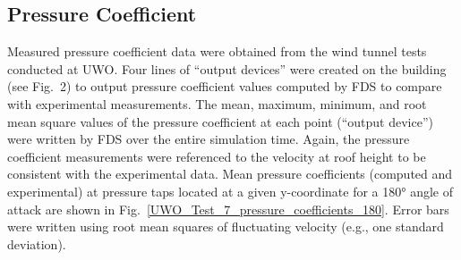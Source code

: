 %
% 
%
%
% 

\subsection{Pressure Coefficient}

Measured pressure coefficient data were obtained from the wind tunnel tests conducted at UWO. Four lines of ``output devices'' were created on the building (see Fig.~2) to output pressure coefficient values computed by FDS to compare with experimental measurements. The mean, maximum, minimum, and root mean square values of the pressure coefficient at each point (``output device'') were written by FDS over the entire simulation time. Again, the pressure coefficient measurements were referenced to the velocity at roof height to be consistent with the experimental data. Mean pressure coefficients (computed and experimental) at pressure taps located at a given y-coordinate for a 180\si{\degree} angle of attack are shown in Fig.~\ref{UWO_Test_7_pressure_coefficients_180}. Error bars were written using root mean squares of fluctuating velocity (e.g., one standard deviation).

